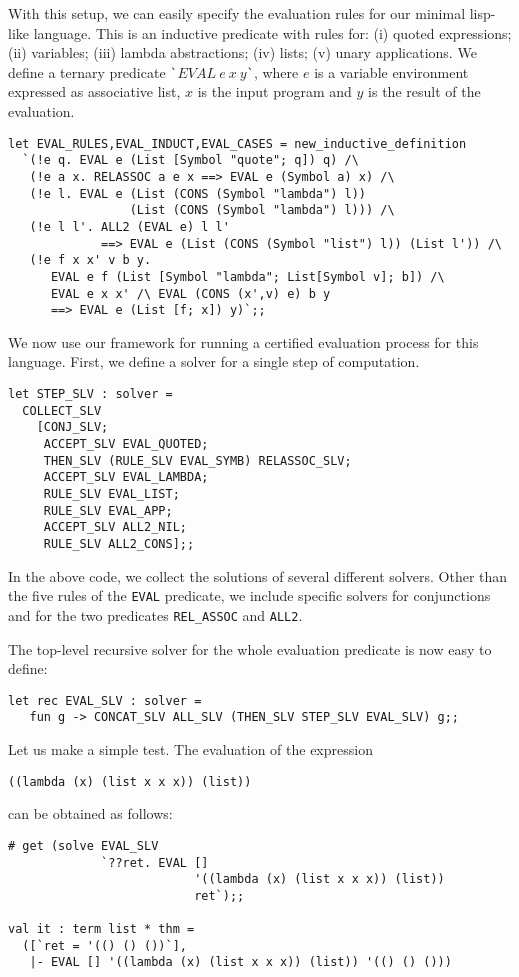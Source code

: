 With this setup, we can easily specify the evaluation rules for our
minimal lisp-like language.  This is an inductive predicate with rules
for: (i) quoted expressions; (ii) variables; (iii) lambda
abstractions; (iv) lists; (v) unary applications.  We define a ternary
predicate \verb|`|$EVAL\ e\ x\ y\mathtt{}$\verb|`|, where $e$
is a variable environment expressed as associative list, $x$ is the
input program and $y$ is the result of the evaluation.
\begin{verbatim}
let EVAL_RULES,EVAL_INDUCT,EVAL_CASES = new_inductive_definition
  `(!e q. EVAL e (List [Symbol "quote"; q]) q) /\
   (!e a x. RELASSOC a e x ==> EVAL e (Symbol a) x) /\
   (!e l. EVAL e (List (CONS (Symbol "lambda") l))
                 (List (CONS (Symbol "lambda") l))) /\
   (!e l l'. ALL2 (EVAL e) l l'
             ==> EVAL e (List (CONS (Symbol "list") l)) (List l')) /\
   (!e f x x' v b y.
      EVAL e f (List [Symbol "lambda"; List[Symbol v]; b]) /\
      EVAL e x x' /\ EVAL (CONS (x',v) e) b y
      ==> EVAL e (List [f; x]) y)`;;
\end{verbatim}

We now use our framework for running a certified evaluation process
for this language.  First, we define a solver for a single step of
computation.
\begin{verbatim}
let STEP_SLV : solver =
  COLLECT_SLV
    [CONJ_SLV;
     ACCEPT_SLV EVAL_QUOTED;
     THEN_SLV (RULE_SLV EVAL_SYMB) RELASSOC_SLV;
     ACCEPT_SLV EVAL_LAMBDA;
     RULE_SLV EVAL_LIST;
     RULE_SLV EVAL_APP;
     ACCEPT_SLV ALL2_NIL;
     RULE_SLV ALL2_CONS];;
\end{verbatim}
In the above code, we collect the solutions of several different
solvers.  Other than the five rules of the \verb|EVAL| predicate, we
include specific solvers for conjunctions and for the two predicates
\verb|REL_ASSOC| and \verb|ALL2|.

The top-level recursive solver for the whole evaluation predicate is now easy to define:
\begin{verbatim}
let rec EVAL_SLV : solver =
   fun g -> CONCAT_SLV ALL_SLV (THEN_SLV STEP_SLV EVAL_SLV) g;;
\end{verbatim}

Let us make a simple test.  The evaluation of the expression
\begin{verbatim}
((lambda (x) (list x x x)) (list))
\end{verbatim}
can be obtained as follows:
\begin{verbatim}
# get (solve EVAL_SLV
             `??ret. EVAL []
                          '((lambda (x) (list x x x)) (list))
                          ret`);;

val it : term list * thm =
  ([`ret = '(() () ())`],
   |- EVAL [] '((lambda (x) (list x x x)) (list)) '(() () ()))
\end{verbatim}

